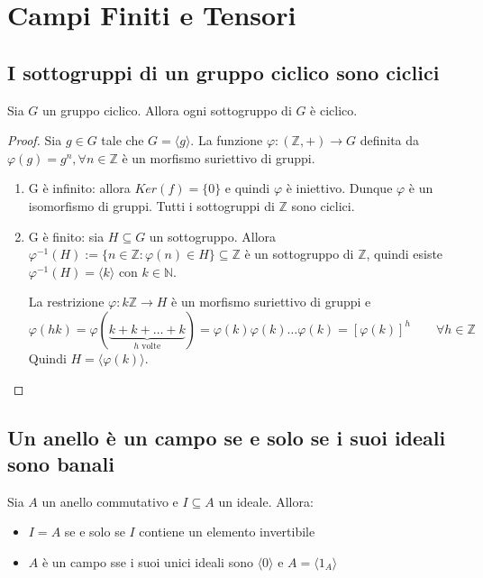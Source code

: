 \documentclass[10pt,a4paper,twoside]{book}
\begin{document}
\chapter{Campi Finiti e Tensori}

\section{I sottogruppi di un gruppo ciclico sono ciclici}

\begin{theorem}
    Sia $G$ un gruppo ciclico. Allora ogni sottogruppo di $G$ è ciclico.
\end{theorem}

\begin{proof}
    Sia $g \in G$ tale che $G = \langle g \rangle$. La funzione $\varphi: (\mathbb{Z} , +) \rightarrow G$ definita da $\varphi(g) = g^n, \forall n \in \mathbb{Z}$ è un morfismo suriettivo di gruppi.
    \begin{enumerate}[label=\alph*)]
        \item G è infinito: allora $Ker(f) = \{0\}$ e quindi $\varphi$ è iniettivo. Dunque $\varphi$ è un
              isomorfismo di gruppi. Tutti i sottogruppi di $\mathbb{Z} $ sono ciclici.
        \item G è finito: sia $H \subseteq G$ un sottogruppo. Allora $\varphi^{-1}(H) := \{n \in \mathbb{Z} : \varphi(n) \in H\} \subseteq \mathbb{Z} $ è un sottogruppo di $\mathbb{Z} $, quindi esiste $\varphi^{-1}(H)= \langle k \rangle$ con $k \in \mathbb{N} $.

              La restrizione $\varphi: k \mathbb{Z} \rightarrow H$ è un morfismo suriettivo di gruppi e
              \begin{equation*}
                  \varphi(hk) = \varphi(\underbrace{k+k+\ldots+k}_{h \text{ volte}}) = \varphi(k) \varphi(k) \ldots \varphi(k) = [\varphi(k)]^h \qquad \forall h \in \mathbb{Z}
              \end{equation*}
              Quindi $H = \langle \varphi(k) \rangle$.
    \end{enumerate}
\end{proof}

\newpage

\section{Un anello è un campo se e solo se i suoi ideali sono banali}
\begin{proposition}
    Sia $A$ un anello commutativo e $I \subseteq A$ un ideale. Allora:
    \begin{itemize}
        \item $I = A$ se e solo se $I$ contiene un elemento invertibile
        \item $A$ è un campo sse i suoi unici ideali sono $\langle 0 \rangle$ e $A = \langle 1_A \rangle$
    \end{itemize}
\end{proposition}
\end{document}
